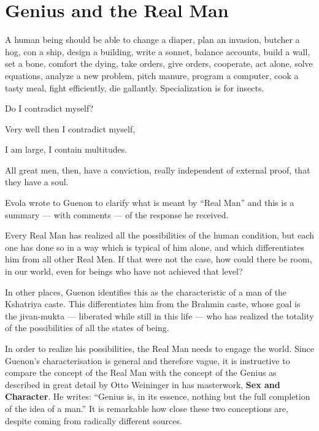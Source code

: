 \section{Genius and the Real Man}

\label{sec:GeniusRealMan}

\begin{quotex}
A human being should be able to change a diaper, plan an invasion, butcher a hog, con a ship, design a building, write a sonnet, balance accounts, build a wall, set a bone, comfort the dying, take orders, give orders, cooperate, act alone, solve equations, analyze a new problem, pitch manure, program a computer, cook a tasty meal, fight efficiently, die gallantly. Specialization is for insects. 

Do I contradict myself?

Very well then I contradict myself,

I am large, I contain multitudes.


All great men, then, have a conviction, really independent of external proof, that they have a soul.


\end{quotex}
Evola wrote to Guenon to clarify what is meant by “Real Man” and this is a summary — with comments — of the response he received.

\begin{quotex}
Every Real Man has realized all the possibilities of the human condition, but each one has done so in a way which is typical of him alone, and which differentiates him from all other Real Men. If that were not the case, how could there be room, in our world, even for beings who have not achieved that level?

\end{quotex}
In other places, Guenon identifies this as the characteristic of a man of the Kshatriya caste. This differentiates him from the Brahmin caste, whose goal is the jivan-mukta — liberated while still in this life — who has realized the totality of the possibilities of all the states of being.

In order to realize his possibilities, the Real Man needs to engage the world. Since Guenon's characterisation is general and therefore vague, it is instructive to compare the concept of the Real Man with the concept of the Genius as described in great detail by Otto Weininger in has masterwork, \textbf{Sex and Character}. He writes: “Genius is, in its essence, nothing but the full completion of the idea of a man.” It is remarkable how close these two conceptions are, despite coming from radically different sources.

